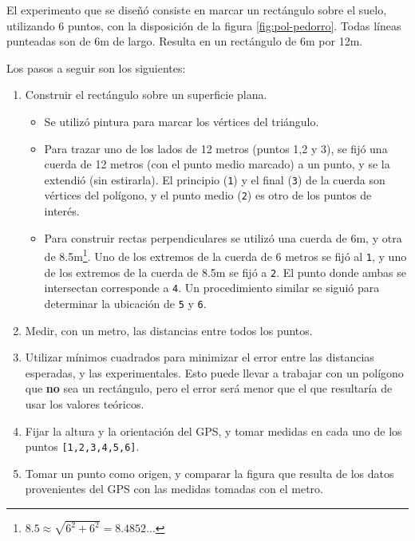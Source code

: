 \documentclass[main]{subfiles}
\begin{document}
El experimento que se dise\~nó consiste en marcar un rectángulo sobre el suelo, utilizando 6 puntos, con la disposición de la figura \ref{fig:pol-pedorro}. Todas líneas punteadas son de 6m de largo. Resulta en un rectángulo de 6m por 12m.

Los pasos a seguir son los siguientes:

\begin{enumerate}
\item Construir el rectángulo sobre un superficie plana.
  \begin{itemize}
  \item Se utilizó pintura para marcar los vértices del triángulo.
  \item Para trazar uno de los lados de 12 metros (puntos 1,2 y 3), se fijó una cuerda de 12 metros (con el punto medio marcado) a un punto, y se la extendió (sin estirarla). El principio (\verb+1+) y el final (\verb+3+) de la cuerda son vértices del polígono, y el punto medio (\verb+2+) es otro de los puntos de interés.
  \item Para construir rectas perpendiculares se utilizó una cuerda de 6m, y otra de 8.5m\footnote{$8.5 \approx \sqrt{6^2 + 6^2} = 8.4852...$}. Uno de los extremos de la cuerda de 6 metros se fijó al \verb+1+, y uno de los extremos de la cuerda de 8.5m se fijó a \verb+2+. El punto donde ambas se intersectan corresponde a \verb+4+. Un procedimiento similar se siguió para determinar la ubicación de \verb+5+ y \verb+6+.
  \end{itemize}
\item Medir, con un metro, las distancias entre todos los puntos.
\item Utilizar mínimos cuadrados para minimizar el error entre las distancias esperadas, y las experimentales. Esto puede llevar a trabajar con un polígono que \textbf{no} sea un rectángulo, pero el error será menor que el que resultaría de usar los valores teóricos.
\item Fijar la altura y la orientación del GPS, y tomar medidas en cada uno de los puntos \verb+[1,2,3,4,5,6]+.
\item Tomar un punto como origen, y comparar la figura que resulta de los datos provenientes del GPS con las medidas tomadas con el metro.
\end{enumerate}
\end{document}
